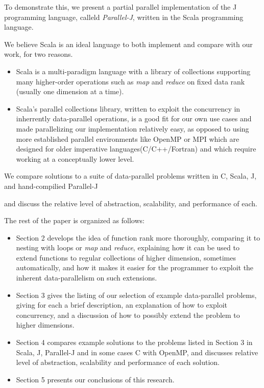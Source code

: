 To demonstrate this, we present a partial parallel implementation of the J programming language, calleld \textit{Parallel-J}, written in the Scala programming language.\begin{comment}TODO cite?\end{comment}
We believe Scala is an ideal language to both implement and compare with our work, for two reasons.
\begin{itemize}
    \item Scala is a multi-paradigm language with a library of collections supporting many higher-order operations such as \textit{map} and \textit{reduce} on fixed data rank (usually one dimension at a time).%
    \item Scala's parallel collections library\cite{pc}, written to exploit the concurrency in inherrently data-parallel operations, is a good fit for our own use cases and made parallelizing our implementation relatively easy, as opposed to using more established parallel environments like OpenMP or MPI which are designed for older imperative languages(C/C++/Fortran) and which require working at a conceptually lower level.
\end{itemize}
We compare solutions to a suite of data-parallel problems written in C, Scala, J, and hand-compilied Parallel-J\begin{comment}TODO really should change name\end{comment} and discuss the relative level of abstraction, scalability, and performance of each.

The rest of the paper is organized as follows:
\begin{itemize}
    \item Section 2 develops the idea of function rank more thoroughly, comparing it to nesting with loops or \textit{map} and \textit{reduce}, explaining how it can be used to extend functions to regular collections of higher dimension, sometimes automatically, and how it makes it easier for the programmer to exploit the inherent data-parallelism on such extensions. 
    \item Section 3 gives the listing of our selection of example data-parallel problems, giving for each a brief description, an explanation of how to exploit concurrency, and a discussion of how to possibly extend the problem to higher dimensions.
    \item Section 4 compares example solutions to the problems listed in Section 3 in Scala, J, Parallel-J and in some cases C with OpenMP, and discusses relative level of abstraction, scalability and performance of each solution. 
    \item Section 5 presents our conclusions of this research.
\end{itemize}

